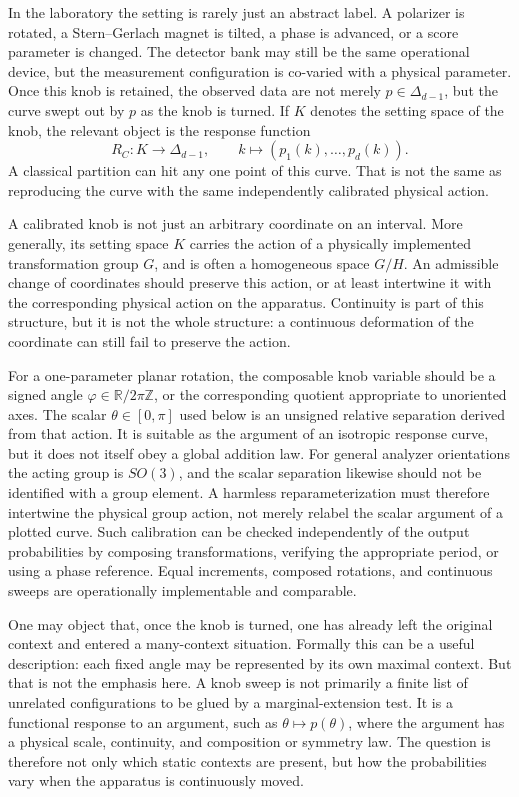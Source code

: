 \documentclass[aps,pra,reprint,superscriptaddress,nofootinbib,floatfix]{revtex4-2}
\begin{document}
In the laboratory the setting is rarely just an abstract label.  A polarizer
is rotated, a Stern--Gerlach magnet is tilted, a phase is advanced, or a score
parameter is changed.  The detector bank may still be the same operational
device, but the measurement configuration is co-varied with a physical
parameter.  Once this knob is retained, the observed data are not merely
\(p\in\Delta_{d-1}\), but the curve swept out by \(p\) as the knob is turned.
If \(K\) denotes the setting space of the knob, the relevant object is the
response function
\begin{equation}
        R_C:K\longrightarrow \Delta_{d-1},\qquad
        k\longmapsto (p_1(k),\ldots,p_d(k)).
        \label{eq:response-function}
\end{equation}
A classical partition can hit any one point of this curve.  That is not the
same as reproducing the curve with the same independently calibrated physical
action.

A calibrated knob is not just an arbitrary coordinate on an interval.  More
generally, its setting space \(K\) carries the action of a physically
implemented transformation group \(G\), and is often a homogeneous space
\(G/H\).  An admissible change of coordinates should preserve this action, or
at least intertwine it with the corresponding physical action on the
apparatus.  Continuity is part of this structure, but it is not the whole
structure: a continuous deformation of the coordinate can still fail to
preserve the action.

For a one-parameter planar rotation, the composable knob variable should be a
signed angle
\(\varphi\in\mathbb{R}/2\pi\mathbb{Z}\), or the corresponding quotient
appropriate to unoriented axes.  The scalar \(\theta\in[0,\pi]\) used below
is an unsigned relative separation derived from that action.  It is suitable
as the argument of an isotropic response curve, but it does not itself obey a
global addition law.  For general analyzer orientations the acting group is
\(SO(3)\), and the scalar separation likewise should not be identified with a
group element.  A harmless reparameterization must therefore intertwine the
physical group action, not merely relabel the scalar argument of a plotted
curve.  Such calibration can be checked independently of the output
probabilities by composing transformations, verifying the appropriate
period, or using a phase reference.  Equal increments, composed rotations,
and continuous sweeps are operationally implementable and comparable.

One may object that, once the knob is turned, one has already left the
original context and entered a many-context situation.  Formally this can be
a useful description: each fixed angle may be represented by its own maximal
context.  But that is not the emphasis here.  A knob sweep is not primarily a
finite list of unrelated configurations to be glued by a marginal-extension
test.  It is a functional response to an argument, such as
\(\theta\mapsto p(\theta)\), where the argument has a physical scale,
continuity, and composition or symmetry law.  The question is therefore not
only which static contexts are present, but how the probabilities vary when
the apparatus is continuously moved.
\end{document}
